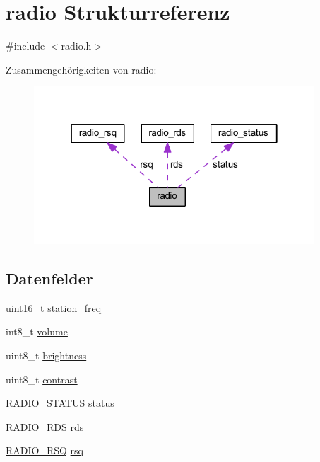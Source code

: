 \hypertarget{structradio}{}\section{radio Strukturreferenz}
\label{structradio}


{\ttfamily \#include $<$radio.\+h$>$}



Zusammengehörigkeiten von radio\+:\nopagebreak
\begin{figure}[H]
\begin{center}
\leavevmode
\includegraphics[width=298pt]{structradio__coll__graph}
\end{center}
\end{figure}
\subsection*{Datenfelder}
\begin{DoxyCompactItemize}
\item 
uint16\+\_\+t \hyperlink{structradio_ae9e2de5c2a6d31fe02952daeb7d0f2cc}{station\+\_\+freq}
\item 
int8\+\_\+t \hyperlink{structradio_a0fe6eefa6e7f7329eb95938b5802289a}{volume}
\item 
uint8\+\_\+t \hyperlink{structradio_a837c871f200f8c3d19d0c7f2e031ffc4}{brightness}
\item 
uint8\+\_\+t \hyperlink{structradio_a1498c49a1583af22b892d695900a74db}{contrast}
\item 
\hyperlink{radio_8h_a903525b4070dadc3575c79be7341f94c}{R\+A\+D\+I\+O\+\_\+\+S\+T\+A\+T\+U\+S} \hyperlink{structradio_ac40df2ac7cfc276418e34335098903fb}{status}
\item 
\hyperlink{radio_8h_a45097f726be0f44e9afecd5102888dbd}{R\+A\+D\+I\+O\+\_\+\+R\+D\+S} \hyperlink{structradio_a44efb20f93a5de661983c36b4a870f4e}{rds}
\item 
\hyperlink{radio_8h_ab4334359915ce423f1ca752a4384a70f}{R\+A\+D\+I\+O\+\_\+\+R\+S\+Q} \hyperlink{structradio_aba45ded08c975dcc6ee7d58687e8534e}{rsq}
\end{DoxyCompactItemize}


